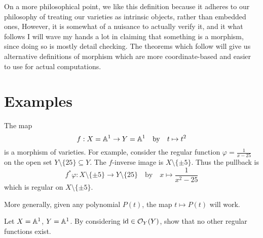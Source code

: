 On a more philosophical point, we like this definition because
it adheres to our philosophy of treating our
varieties as intrinsic objects, rather than embedded ones,
However, it is somewhat of a nuisance to actually verify it,
and it what follows I will wave my hands a lot in claiming
that something is a morphism, since doing so is mostly detail checking.
The theorems which follow will give us alternative definitions
of morphism which are more coordinate-based
and easier to use for actual computations.

\section{Examples}
\begin{example}
	The map 
	\[ f : X = \mathbb A^1 \to Y = \mathbb A^1 \quad\text{by}\quad t \mapsto t^2 \]
	is a morphism of varieties.
	For example, consider the regular function $\varphi = \frac{1}{x-25}$ on
	the open set $Y \setminus \{25\} \subseteq Y$.
	The $f$-inverse image is $X \setminus \{\pm5\}$.
	Thus the pullback is
	\[ f^\ast\varphi : X \setminus \{\pm5\} \to Y \setminus \{25\}
		\quad\text{by}\quad x \mapsto \frac{1}{x^2-25} \]
	which is regular on $X \setminus \{\pm5\}$.

	More generally, given any polynomial $P(t)$,
	the map $t \mapsto P(t)$ will work.
\end{example}
\begin{exercise}
	Let $X = \mathbb A^1$, $Y = \mathbb A^1$.
	By considering $\mathrm{id} \in \mathcal O_Y(Y)$, show that no other
	regular functions exist.
\end{exercise}

